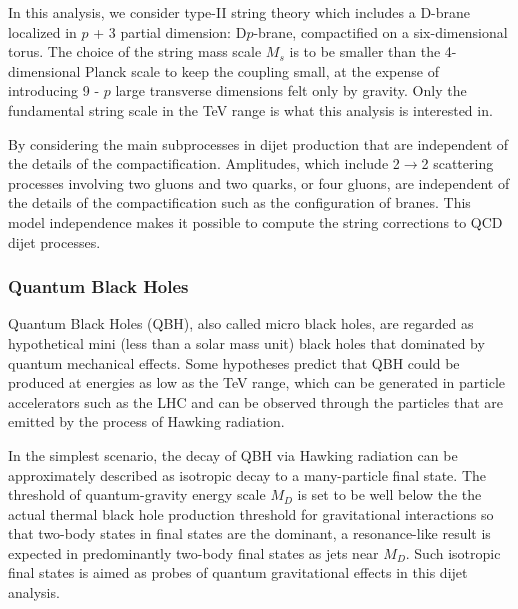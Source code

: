 \documentclass[UTF8,12pt]{ctexart}
\numberwithin{equation}{section}
\def\to{\rightarrow}
\begin{document}
In this analysis, we consider type-II string theory which includes a D-brane localized in $p$ + 3 partial dimension: D$p$-brane, compactified on a six-dimensional torus. The choice of the string mass scale $M_s$ is to be smaller than the 4-dimensional Planck scale to keep the coupling small, at the expense of introducing 9 - $p$ large transverse dimensions felt only by gravity. Only the fundamental string scale in the TeV range is what this analysis is interested in.


By considering the main subprocesses in dijet production that are independent of the details of the compactification. Amplitudes, which include 2$\to$2 scattering processes involving two gluons and two quarks, or four gluons,  are independent of the details of the compactification such as the configuration of branes. This model independence makes it possible to compute the string corrections to QCD dijet processes.


\subsubsection{Quantum Black Holes}
\label{sec:2.2.3}

Quantum Black Holes (QBH), also called micro black holes, are regarded as hypothetical mini (less than a solar mass unit) black holes that dominated by quantum mechanical effects. Some hypotheses predict that QBH could be produced at energies as low as the TeV range, which can be generated in particle accelerators such as the LHC and can be observed through the particles that are emitted by the process of Hawking radiation.


In the simplest scenario, the decay of QBH via Hawking radiation can be approximately described as isotropic decay to a many-particle final state.  The threshold of quantum-gravity energy scale $M_D$ is set to be well below the 
the actual thermal black hole production threshold for gravitational interactions so that two-body states in final states are the dominant, a resonance-like result is expected in predominantly two-body final states as jets near $M_D$. Such isotropic final states is aimed as probes of quantum gravitational effects in this dijet analysis.
\end{document}
